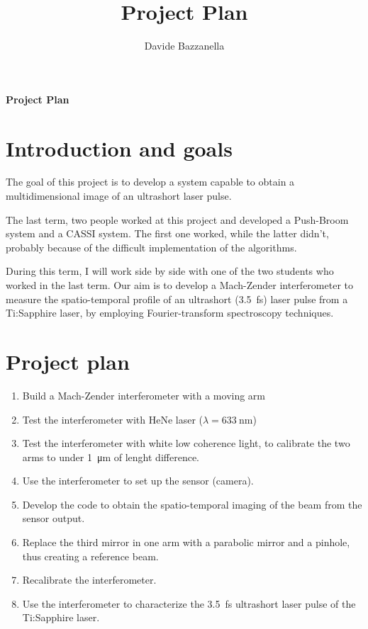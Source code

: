 \documentclass[12pt,a4paper]{report}
\author{Davide Bazzanella}
\title{Project Plan}
\begin{document}
\textbf{\Huge{Project Plan}}
\section*{Introduction and goals}
The goal of this project is to develop a system capable to obtain a multidimensional image of an ultrashort laser pulse.

The last term, two people worked at this project and developed a Push-Broom system and a CASSI system.
The first one worked, while the latter didn't, probably because of the difficult implementation of the algorithms.

During this term, I will work side by side with one of the two students who worked in the last term.
Our aim is to develop a Mach-Zender interferometer to measure the spatio-temporal profile of an ultrashort (\SI{3.5}{\fs}) laser pulse from a Ti:Sapphire laser, by employing Fourier-transform spectroscopy techniques.

\section*{Project plan}
\begin{enumerate}
\item Build a Mach-Zender interferometer with a moving arm
\item Test the interferometer with HeNe laser ($\lambda = \SI{633}{\nm}$)
\item Test the interferometer with white low coherence light, to calibrate the two arms to under \SI{1}{\um} of lenght difference.
\item Use the interferometer to set up the sensor (camera).
\item Develop the code to obtain the spatio-temporal imaging of the beam from the sensor output.
\item Replace the third mirror in one arm with a parabolic mirror and a pinhole, thus creating a reference beam.
\item Recalibrate the interferometer.
\item Use the interferometer to characterize the \SI{3.5}{\fs} ultrashort laser pulse of the Ti:Sapphire laser.
\end{enumerate}
\end{document}
